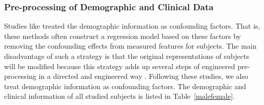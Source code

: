 \documentclass[journal]{IEEEtran}
\begin{document}
\subsubsection{Pre-processing of Demographic and Clinical Data}
\label{textdata}
Studies like \cite{dukart2011age, de2016machine} treated the demographic information as confounding factors. That is, these methods often construct a regression model based on these factors by removing the confounding effects from measured features for subjects. The main disadvantage of such a strategy is that the original representations of subjects will be modified because this strategy adds up several steps of engineered pre-processing in a directed and engineered way \cite{liu2018joint}. 
Following these studies, we also treat demographic information as confounding factors. The demographic and clinical information of all studied subjects is listed in Table~\ref{malefemale}.
\end{document}
